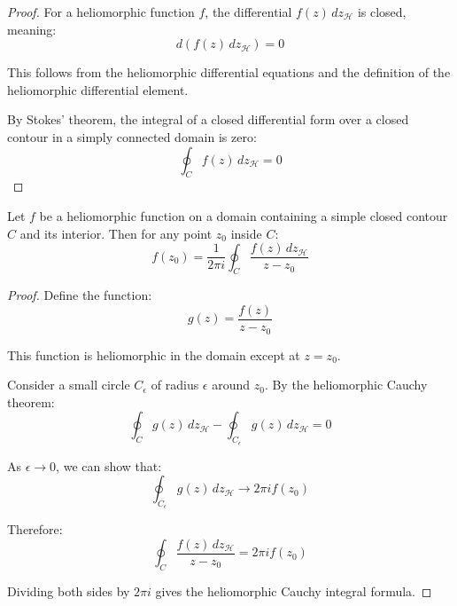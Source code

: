 \begin{proof}
For a heliomorphic function $f$, the differential $f(z) \, dz_{\mathcal{H}}$ is closed, meaning:
\begin{equation}
d(f(z) \, dz_{\mathcal{H}}) = 0
\end{equation}

This follows from the heliomorphic differential equations and the definition of the heliomorphic differential element.

By Stokes' theorem, the integral of a closed differential form over a closed contour in a simply connected domain is zero:
\begin{equation}
\oint_C f(z) \, dz_{\mathcal{H}} = 0
\end{equation}
\end{proof}

\begin{theorem}
Let $f$ be a heliomorphic function on a domain containing a simple closed contour $C$ and its interior. Then for any point $z_0$ inside $C$:
\begin{equation}
f(z_0) = \frac{1}{2\pi i} \oint_C \frac{f(z) \, dz_{\mathcal{H}}}{z - z_0}
\end{equation}
\end{theorem}

\begin{proof}
Define the function:
\begin{equation}
g(z) = \frac{f(z)}{z - z_0}
\end{equation}

This function is heliomorphic in the domain except at $z = z_0$.

Consider a small circle $C_\epsilon$ of radius $\epsilon$ around $z_0$. By the heliomorphic Cauchy theorem:
\begin{equation}
\oint_{C} g(z) \, dz_{\mathcal{H}} - \oint_{C_\epsilon} g(z) \, dz_{\mathcal{H}} = 0
\end{equation}

As $\epsilon \to 0$, we can show that:
\begin{equation}
\oint_{C_\epsilon} g(z) \, dz_{\mathcal{H}} \to 2\pi i f(z_0)
\end{equation}

Therefore:
\begin{equation}
\oint_{C} \frac{f(z) \, dz_{\mathcal{H}}}{z - z_0} = 2\pi i f(z_0)
\end{equation}

Dividing both sides by $2\pi i$ gives the heliomorphic Cauchy integral formula.
\end{proof}

